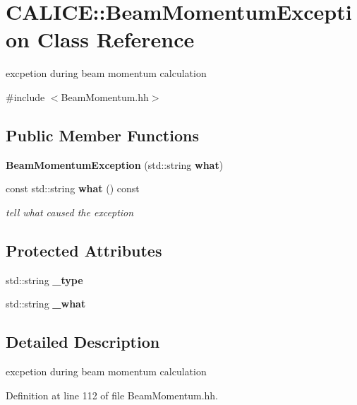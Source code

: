 \section{C\-A\-L\-I\-C\-E\-:\-:Beam\-Momentum\-Exception Class Reference}
\label{classCALICE_1_1BeamMomentumException}


excpetion during beam momentum calculation  




{\ttfamily \#include $<$Beam\-Momentum.\-hh$>$}

\subsection*{Public Member Functions}
\begin{DoxyCompactItemize}
\item 
{\bf Beam\-Momentum\-Exception} (std\-::string {\bf what})
\item 
const std\-::string {\bf what} () const \label{classCALICE_1_1BeamMomentumException_abf96d139d64de8fd11114234cac573f8}

\begin{DoxyCompactList}\small\item\em tell what caused the exception \end{DoxyCompactList}\end{DoxyCompactItemize}
\subsection*{Protected Attributes}
\begin{DoxyCompactItemize}
\item 
std\-::string {\bfseries \-\_\-type}\label{classCALICE_1_1BeamMomentumException_a6e2c3f65164d99f3e01a2eb02d88701d}

\item 
std\-::string {\bfseries \-\_\-what}\label{classCALICE_1_1BeamMomentumException_a8cbcb9dc73807afc3db99a463baa0933}

\end{DoxyCompactItemize}


\subsection{Detailed Description}
excpetion during beam momentum calculation 

Definition at line 112 of file Beam\-Momentum.\-hh.



